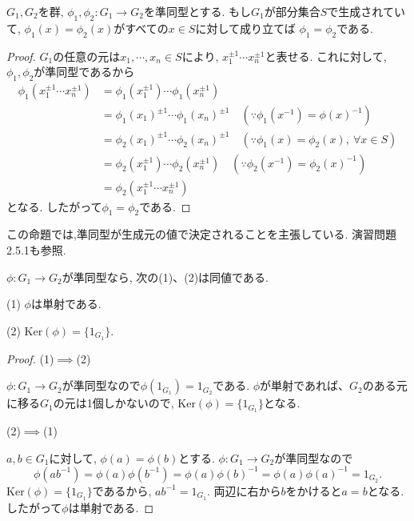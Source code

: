 \begin{tcolorbox}
	\begin{prp*}
		$G_1, G_2$を群, $\phi_1, \phi_2: G_1 \to G_2 $を準同型とする.
		もし$G_1$が部分集合$S$で生成されていて,
		$\phi_1(x)=\phi_2(x)$がすべての$x \in S$に対して成り立てば
		$\phi_1=\phi_2$である.
	\end{prp*}
\end{tcolorbox}
\begin{proof}
	$G_1$の任意の元は$x_1,\cdots,x_n \in S$により,
	$x_1^{\pm 1}\cdots x_n^{\pm 1}$と表せる.
	これに対して, $\phi_1,\phi_2$が準同型であるから
    \begin{align*}
      \phi_1(x_1^{\pm 1}\cdots x_n^{\pm 1}) 
      &=\phi_1(x_1^{\pm 1})\cdots \phi_1(x_n^{\pm 1}) \\
      &=\phi_1(x_1)^{\pm 1} \cdots \phi_1(x_n)^{\pm 1} \quad (\because \phi_1(x^{-1})=\phi(x)^{-1})\\
      &=\phi_2(x_1)^{\pm 1} \cdots \phi_2(x_n)^{\pm 1} \quad (\because \phi_1(x)=\phi_2(x),\: \forall x \in S)\\
      &=\phi_2(x_1^{\pm 1})\cdots \phi_2(x_n^{\pm 1}) \quad (\because \phi_2(x^{-1})=\phi_2(x)^{-1})\\
      &=\phi_2(x_1^{\pm 1} \cdots x_n^{\pm 1})
    \end{align*}
	となる.
	したがって$\phi_1 = \phi_2$である.
\end{proof}
この命題では,準同型が生成元の値で決定されることを主張している.
演習問題2.5.1も参照.
\newline

\begin{tcolorbox}
  \begin{prp*}
    $ \phi:G_1 \to G_2 $が準同型なら, 次の(1)、(2)は同値である.
  
    (1) $\phi$は単射である.
  
    (2) $\mathrm{Ker}(\phi) = \{ 1_{G_1} \}$.
  \end{prp*}
\end{tcolorbox}
\begin{proof}
  (1)$\implies$(2)
  
  $ \phi:G_1 \to G_2 $が準同型なので$\phi(1_{G_1})=1_{G_2}$である.
   $\phi$が単射であれば、$G_2$のある元に移る$G_1$の元は1個しかないので,
   $\mathrm{Ker}(\phi) = \{ 1_{G_1} \}$となる.
   
  (2)$\implies$(1)
  
  $a,b \in G_1$に対して, $\phi(a) = \phi(b)$とする.
  $ \phi:G_1 \to G_2 $が準同型なので
  \[
  \phi(ab^{-1}) = \phi(a)\phi(b^{-1}) = \phi(a)\phi(b)^{-1}
   = \phi(a)\phi(a)^{-1} = 1_{G_2}.
  \]
  $\mathrm{Ker}(\phi) = \{ 1_{G_1} \}$であるから, $ab^{-1}=1_{G_1}$.
  両辺に右から$b$をかけると$a=b$となる.
  したがって$\phi$は単射である.
\end{proof}\leavevmode

